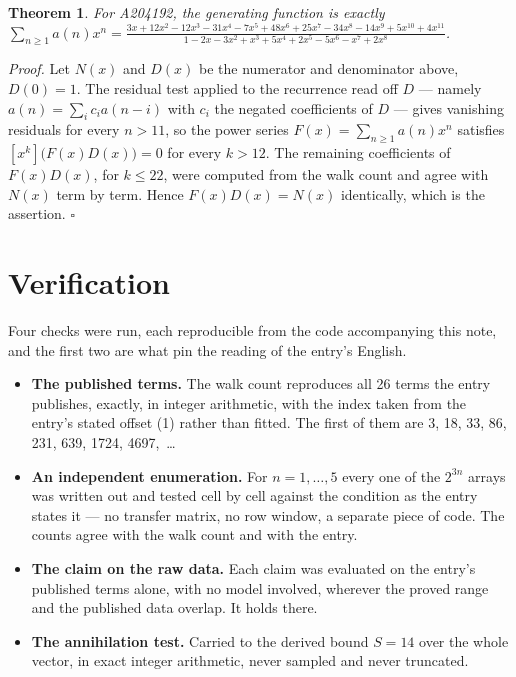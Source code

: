 \documentclass[11pt]{article}
\newtheorem{theorem}{Theorem}
\theoremstyle{definition}
\begin{document}
\begin{theorem} For A204192, the generating function is exactly $\sum_{n\ge 1} a(n)x^n = \frac{3x + 12x^{2} - 12x^{3} - 31x^{4} - 7x^{5} + 48x^{6} + 25x^{7} - 34x^{8} - 14x^{9} + 5x^{10} + 4x^{11}}{1 - 2x - 3x^{2} + x^{3} + 5x^{4} + 2x^{5} - 5x^{6} - x^{7} + 2x^{8}}$.\end{theorem}

{\itshape Proof.} Let $N(x)$ and $D(x)$ be the numerator and denominator above, $D(0)=1$. The residual test applied to the recurrence read off $D$ --- namely $a(n) = \sum_i c_i a(n-i)$ with $c_i$ the negated coefficients of $D$ --- gives vanishing residuals for every $n > 11$, so the power series $F(x)=\sum_{n\ge 1}a(n)x^n$ satisfies $[x^k]\bigl(F(x)D(x)\bigr) = 0$ for every $k > 12$. The remaining coefficients of $F(x)D(x)$, for $k \le 22$, were computed from the walk count and agree with $N(x)$ term by term. Hence $F(x)D(x) = N(x)$ identically, which is the assertion. $\square$

\section{Verification}

Four checks were run, each reproducible from the code accompanying this note, and the first two are what pin the reading of the entry's English.

\begin{itemize}

\item {\bfseries The published terms.} The walk count reproduces all 26 terms the entry publishes, exactly, in integer arithmetic, with the index taken from the entry's stated offset (1) rather than fitted. The first of them are 3, 18, 33, 86, 231, 639, 1724, 4697,~\dots

\item {\bfseries An independent enumeration.} For $n = 1,\dots,5$ every one of the $2^{3n}$ arrays was written out and tested cell by cell against the condition as the entry states it --- no transfer matrix, no row window, a separate piece of code. The counts agree with the walk count and with the entry.

\item {\bfseries The claim on the raw data.} Each claim was evaluated on the entry's published terms alone, with no model involved, wherever the proved range and the published data overlap. It holds there.

\item {\bfseries The annihilation test.} Carried to the derived bound $S = 14$ over the whole vector, in exact integer arithmetic, never sampled and never truncated.

\end{itemize}
\end{document}
